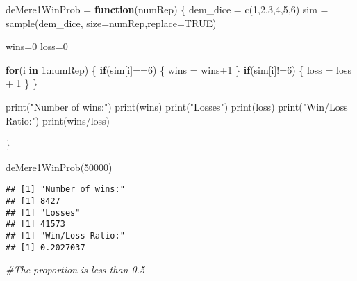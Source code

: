 \documentclass[
]{article}
\newenvironment{Shaded}{\begin{snugshade}}{\end{snugshade}}
\newcommand{\AttributeTok}[1]{\textcolor[rgb]{0.77,0.63,0.00}{#1}}
\newcommand{\CommentTok}[1]{\textcolor[rgb]{0.56,0.35,0.01}{\textit{#1}}}
\newcommand{\ConstantTok}[1]{\textcolor[rgb]{0.00,0.00,0.00}{#1}}
\newcommand{\ControlFlowTok}[1]{\textcolor[rgb]{0.13,0.29,0.53}{\textbf{#1}}}
\newcommand{\DecValTok}[1]{\textcolor[rgb]{0.00,0.00,0.81}{#1}}
\newcommand{\FunctionTok}[1]{\textcolor[rgb]{0.00,0.00,0.00}{#1}}
\newcommand{\NormalTok}[1]{#1}
\newcommand{\OtherTok}[1]{\textcolor[rgb]{0.56,0.35,0.01}{#1}}
\newcommand{\SpecialCharTok}[1]{\textcolor[rgb]{0.00,0.00,0.00}{#1}}
\newcommand{\StringTok}[1]{\textcolor[rgb]{0.31,0.60,0.02}{#1}}
\begin{document}
\begin{Shaded}
\begin{Highlighting}[]
\NormalTok{deMere1WinProb }\OtherTok{=} \ControlFlowTok{function}\NormalTok{(numRep)}
\NormalTok{\{}
\NormalTok{  dem\_dice }\OtherTok{=} \FunctionTok{c}\NormalTok{(}\DecValTok{1}\NormalTok{,}\DecValTok{2}\NormalTok{,}\DecValTok{3}\NormalTok{,}\DecValTok{4}\NormalTok{,}\DecValTok{5}\NormalTok{,}\DecValTok{6}\NormalTok{)}
\NormalTok{  sim }\OtherTok{=} \FunctionTok{sample}\NormalTok{(dem\_dice, }\AttributeTok{size=}\NormalTok{numRep,}\AttributeTok{replace=}\ConstantTok{TRUE}\NormalTok{)}
  
\NormalTok{  wins}\OtherTok{=}\DecValTok{0}
\NormalTok{  loss}\OtherTok{=}\DecValTok{0}
  
  \ControlFlowTok{for}\NormalTok{(i }\ControlFlowTok{in} \DecValTok{1}\SpecialCharTok{:}\NormalTok{numRep)}
\NormalTok{  \{}
    \ControlFlowTok{if}\NormalTok{(sim[i]}\SpecialCharTok{==}\DecValTok{6}\NormalTok{)}
\NormalTok{    \{}
\NormalTok{      wins }\OtherTok{=}\NormalTok{ wins}\SpecialCharTok{+}\DecValTok{1}
\NormalTok{    \}}
    \ControlFlowTok{if}\NormalTok{(sim[i]}\SpecialCharTok{!=}\DecValTok{6}\NormalTok{)}
\NormalTok{    \{}
\NormalTok{      loss }\OtherTok{=}\NormalTok{ loss }\SpecialCharTok{+} \DecValTok{1}
\NormalTok{    \}}
\NormalTok{  \}}
  
  
  \FunctionTok{print}\NormalTok{(}\StringTok{"Number of wins:"}\NormalTok{)}
  \FunctionTok{print}\NormalTok{(wins)}
  \FunctionTok{print}\NormalTok{(}\StringTok{"Losses"}\NormalTok{)}
  \FunctionTok{print}\NormalTok{(loss)}
  \FunctionTok{print}\NormalTok{(}\StringTok{"Win/Loss Ratio:"}\NormalTok{)}
  \FunctionTok{print}\NormalTok{(wins}\SpecialCharTok{/}\NormalTok{loss)}
  
\NormalTok{\}}
\end{Highlighting}
\end{Shaded}

\begin{Shaded}
\begin{Highlighting}[]
\FunctionTok{deMere1WinProb}\NormalTok{(}\DecValTok{50000}\NormalTok{)}
\end{Highlighting}
\end{Shaded}

\begin{verbatim}
## [1] "Number of wins:"
## [1] 8427
## [1] "Losses"
## [1] 41573
## [1] "Win/Loss Ratio:"
## [1] 0.2027037
\end{verbatim}

\begin{Shaded}
\begin{Highlighting}[]
\CommentTok{\#The proportion is less than 0.5}
\end{Highlighting}
\end{Shaded}
\end{document}
